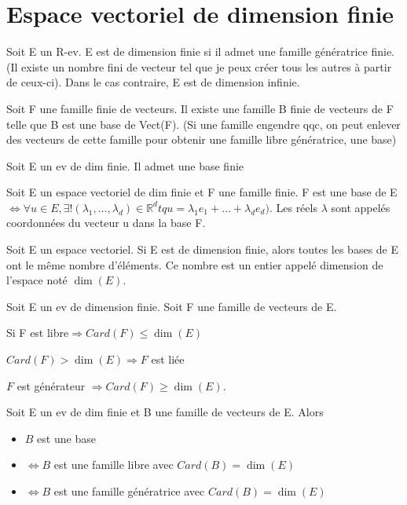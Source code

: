\documentclass[french]{yLectureNote}
\newcommand{\R}[0]{\mathbb{R}}
\begin{document}
\section{Espace vectoriel de dimension finie}
\begin{definition}
Soit E un R-ev. E est de dimension finie si il admet une famille génératrice finie. (Il existe un nombre fini de vecteur tel que je peux créer tous les autres à partir de ceux-ci). Dans le cas contraire, E est de dimension infinie.
\end{definition}
\begin{proposition}
Soit F une famille finie de vecteurs. Il existe une famille B finie de vecteurs de F telle que B est une base de Vect(F). (Si une famille engendre qqc, on peut enlever des vecteurs de cette famille pour obtenir une famille libre génératrice, une base)
\end{proposition}
\begin{proposition}
Soit E un ev de dim finie. Il admet une base finie
\end{proposition}
\begin{theorem}[Coordonnées]
 Soit E un espace vectoriel de dim finie et F une famille finie. F est une base de E \(\iff \forall u\in E, \exists! (\lambda_1,\dots,\lambda_d)\in \R^d tq u = \lambda_1e_1+\dots+\lambda_de_d)\). Les réels \(\lambda\) sont appelés coordonnées du vecteur u dans la base F.
\end{theorem}
\begin{theorem}[Dimension]
 Soit E un espace vectoriel. Si E est de dimension finie, alors toutes les bases de E ont le m\^eme nombre d'éléments. Ce nombre est un entier appelé dimension de l'espace noté $\dim(E)$.
\end{theorem}
\begin{proposition}
Soit E un ev de dimension finie. Soit F une famille de vecteurs de E.

Si F est libre\( \Rightarrow Card(F)\leq \dim(E)\)

\(Card(F)>\dim(E) \Rightarrow F\) est liée

\(F\) est générateur \(\Rightarrow Card(F) \geq \dim(E)\).
\end{proposition}
\begin{theorem}[]
 Soit E un ev de dim finie et B une famille de vecteurs de E. Alors
 \begin{itemize}
  \item \(B\) est une base
  \item \(\iff B\) est une famille libre avec \(Card(B) = \dim(E)\)
  \item \(\iff B\) est une famille génératrice avec \(Card(B) = \dim(E)\)
 \end{itemize}
\end{theorem}
\end{document}

